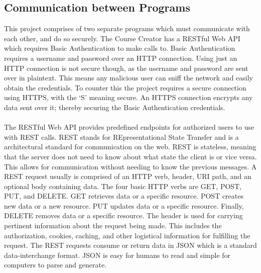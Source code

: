 \subsection{Communication between Programs}
This project comprises of two separate programs which must communicate with each other, and do so securely. The Course Creator has a RESTful Web API which requires Basic Authentication to make calls to.  Basic Authentication requires a username and password over an HTTP connection. Using just an HTTP connection is not secure though, as the username and password are sent over in plaintext. This means any malicious user can sniff the network and easily obtain the credentials. To counter this the project requires a secure connection using HTTPS, with the `S' meaning secure. An HTTPS connection encrypts any data sent over it; thereby securing the Basic Authentication credentials. \\
\\
The RESTful Web API provides predefined endpoints for authorized users to use with REST calls. REST stands for REpresentational State Transfer and is a architectural standard for communication on the web. REST is stateless, meaning that the server does not need to know about what state the client is or vice versa. This allows for communication without needing to know the previous messages. A REST request usually is comprised of an HTTP verb, header, URI path, and an optional body containing data. The four basic HTTP verbs are GET, POST, PUT, and DELETE. GET retrieves data or a specific resource. POST creates new data or a new resource. PUT updates data or a specific resource. Finally, DELETE removes data or a specific resource. The header is used for carrying pertinent information about the request being made. This includes the authorization, cookies, caching, and other logistical information for fulfilling the request. The REST requests consume or return data in JSON which is a standard data-interchange format. JSON is easy for humans to read and simple for computers to parse and generate.


